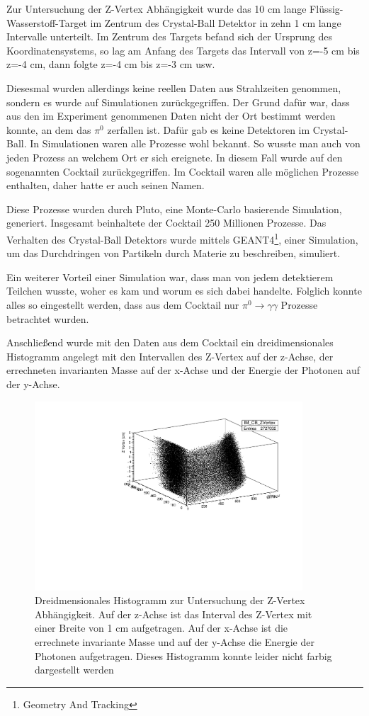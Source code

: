 \documentclass[a4paper,11pt,oneside,final,german,openbib,pdftex]{scrbook}
\begin{document}
Zur Untersuchung der Z-Vertex Abhängigkeit wurde das 10 cm lange Fl\"ussig-Wasserstoff-Target im Zentrum des Crystal-Ball Detektor in zehn 1 cm lange Intervalle unterteilt. Im Zentrum des Targets befand sich der Ursprung des Koordinatensystems, so lag am Anfang des Targets das Intervall von z=-5 cm bis z=-4 cm, dann folgte z=-4 cm bis z=-3 cm usw. 

Diesesmal wurden allerdings keine reellen Daten aus Strahlzeiten genommen, sondern es wurde auf Simulationen zur\"uckgegriffen. Der Grund daf\"ur war, dass aus den im Experiment genommenen Daten nicht der Ort bestimmt werden konnte, an dem das $\pi^0$ zerfallen ist. Daf\"ur gab es keine Detektoren im Crystal-Ball. In Simulationen waren alle Prozesse wohl bekannt. So wusste man auch von jeden Prozess an welchem Ort er sich ereignete. In diesem Fall wurde auf den sogenannten Cocktail zur\"uckgegriffen. Im Cocktail waren alle m\"oglichen Prozesse enthalten, daher hatte er auch seinen Namen. 

Diese Prozesse wurden durch Pluto, eine Monte-Carlo basierende Simulation, generiert. Insgesamt beinhaltete der Cocktail 250 Millionen Prozesse. Das Verhalten des Crystal-Ball Detektors wurde mittels GEANT4\footnote{Geometry And Tracking}, einer Simulation, um das Durchdringen von Partikeln durch Materie zu beschreiben, simuliert.

Ein weiterer Vorteil einer Simulation war, dass man von jedem detektierem Teilchen wusste, woher es kam und worum es sich dabei handelte. Folglich konnte alles so eingestellt werden, dass aus dem Cocktail nur $\pi^0 \rightarrow \gamma \gamma$ Prozesse betrachtet wurden.

 Anschließend wurde mit den Daten aus dem Cocktail ein dreidimensionales Histogramm angelegt mit den Intervallen des Z-Vertex auf der z-Achse, der errechneten invarianten Masse auf der x-Achse und der Energie der Photonen auf der y-Achse. 

\begin{figure}[h!]
	\begin{center}
		\includegraphics[width=100mm]{ZVertex3DHisto}
		\caption{Dreidmensionales Histogramm zur Untersuchung der Z-Vertex Abh\"angigkeit. Auf der z-Achse ist das Interval des Z-Vertex mit einer Breite von 1 cm aufgetragen. Auf der x-Achse ist die errechnete invariante Masse und auf der y-Achse die Energie der Photonen aufgetragen. Dieses Histogramm konnte leider nicht farbig dargestellt werden}
		\label{fig:Z-Vertex-3D-Histogramm}
	\end{center}
\end{figure}
\end{document}
